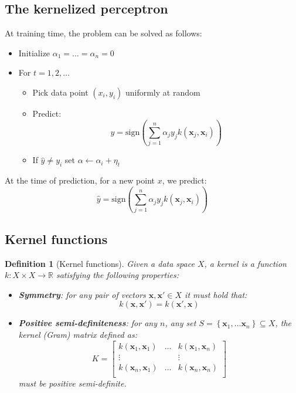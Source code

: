 \documentclass[a4paper,10pt,twoside]{article}
\newtheorem{definition}{Definition}[section]
\begin{document}
\subsection{The kernelized perceptron}
At training time, the problem can be solved as follows:
\begin{itemize}
    \item Initialize $\alpha_1=\ldots=\alpha_n=0$
    \item For $t=1,2,\ldots$
    \begin{itemize}
        \item Pick data point $(x_i, y_i)$ uniformly at random
        \item Predict:
        \begin{equation*}
            \hat{y} = \text{sign}(\sum_{j=1}^{n}\alpha_jy_jk(\mathbf{x}_j, \mathbf{x}_i))
        \end{equation*}
        \item If $\hat{y}\neq y_i$ set $\alpha\leftarrow \alpha_i+\eta_t$
    \end{itemize}
\end{itemize}
At the time of prediction, for a new point $x$, we predict:
\begin{equation*}
    \hat{y} = \text{sign}(\sum_{j=1}^{n}\alpha_jy_jk(\mathbf{x}_j, \mathbf{x}_i))
\end{equation*}
\subsection{Kernel functions}
\begin{definition}[Kernel functions]
    Given a data space $X$, a kernel is a function $k:X\times X\rightarrow\mathbb{R}$ satisfying the following properties:
    \begin{itemize}
        \item \textbf{Symmetry}: for any pair of vectors $\mathbf{x}, \mathbf{x}'\in X$ it must hold that:
        \begin{equation*}
            k(\mathbf{x}, \mathbf{x}')=k(\mathbf{x}', \mathbf{x})
        \end{equation*}
        \item \textbf{Positive semi-definiteness}: for any $n$, any set $S=\left\{\mathbf{x}_1,\ldots\mathbf{x}_n\right\}\subseteq X$, the kernel (Gram) matrix defined as:
        \begin{equation*}
            K = \begin{bmatrix}
                k(\mathbf{x}_1, \mathbf{x}_1) & \ldots & k(\mathbf{x}_1, \mathbf{x}_n)\\
                \vdots & & \vdots\\
                k(\mathbf{x}_n, \mathbf{x}_1) & \ldots & k(\mathbf{x}_n, \mathbf{x}_n)\\
            \end{bmatrix}
        \end{equation*}
        must be positive semi-definite.
    \end{itemize}
\end{definition}
\end{document}

